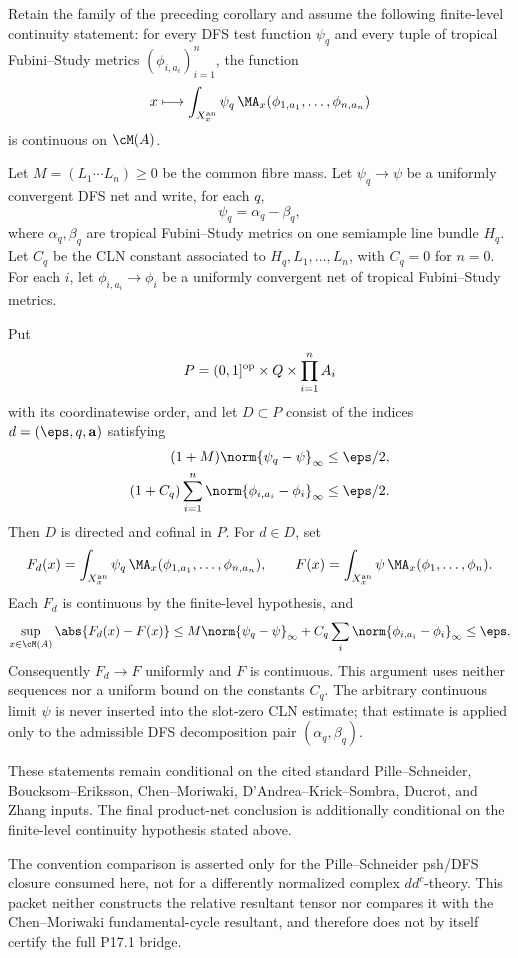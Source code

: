 \begin{corollary}
\label{cor:p171-production-product-net}
Retain the family of the preceding corollary and assume the following
finite-level continuity statement: for every DFS test function
\(\psi_q\) and every tuple of tropical Fubini--Study metrics
\((\phi_{i,a_i})_{i=1}^n\), the function
\[
 x\longmapsto
 \int_{X_x^{\rm an}}\psi_q\,
 \MA_x(\phi_{1,a_1},\ldots,\phi_{n,a_n})
\]
is continuous on \(\cM(A)\).

Let \(M=(L_1\cdots L_n)\geq0\) be the common fibre mass.  Let
\(\psi_q\to\psi\) be a uniformly convergent DFS net and write, for each
\(q\),
\[
 \psi_q=\alpha_q-\beta_q,
\]
where \(\alpha_q,\beta_q\) are tropical Fubini--Study metrics on one
semiample line bundle \(H_q\).  Let \(C_q\) be the CLN constant associated
to \(H_q,L_1,\ldots,L_n\), with \(C_q=0\) for \(n=0\).  For each \(i\),
let \(\phi_{i,a_i}\to\phi_i\) be a uniformly convergent net of tropical
Fubini--Study metrics.

Put
\[
 P=(0,1]^{\rm op}\times Q\times\prod_{i=1}^nA_i
\]
with its coordinatewise order, and let \(D\subset P\) consist of the
indices \(d=(\eps,q,\mathbf a)\) satisfying
\begin{align}
 (1+M)\norm{\psi_q-\psi}_\infty&\leq\eps/2,
 \label{eq:p171-production-product-test}\\
 (1+C_q)\sum_{i=1}^n
 \norm{\phi_{i,a_i}-\phi_i}_\infty&\leq\eps/2.
 \label{eq:p171-production-product-metrics}
\end{align}
Then \(D\) is directed and cofinal in \(P\).  For \(d\in D\), set
\[
 F_d(x)=
 \int_{X_x^{\rm an}}\psi_q\,
 \MA_x(\phi_{1,a_1},\ldots,\phi_{n,a_n}),
 \qquad
 F(x)=
 \int_{X_x^{\rm an}}\psi\,
 \MA_x(\phi_1,\ldots,\phi_n).
\]
Each \(F_d\) is continuous by the finite-level hypothesis, and
\begin{equation}
 \sup_{x\in\cM(A)}\abs{F_d(x)-F(x)}
 \leq
 M\norm{\psi_q-\psi}_\infty
 +
 C_q\sum_i\norm{\phi_{i,a_i}-\phi_i}_\infty
 \leq\eps.
 \label{eq:p171-production-product-bound}
\end{equation}
Consequently \(F_d\to F\) uniformly and \(F\) is continuous.  This
argument uses neither sequences nor a uniform bound on the constants
\(C_q\).  The arbitrary continuous limit \(\psi\) is never inserted into
the slot-zero CLN estimate; that estimate is applied only to the
admissible DFS decomposition pair \((\alpha_q,\beta_q)\).
\end{corollary}

\begin{remark}
These statements remain conditional on the cited standard
Pille--Schneider, Boucksom--Eriksson, Chen--Moriwaki,
D'Andrea--Krick--Sombra, Ducrot, and Zhang inputs.  The final
product-net conclusion is additionally conditional on the finite-level
continuity hypothesis stated above.

The convention comparison is asserted only for the
Pille--Schneider psh/DFS closure consumed here, not for a differently
normalized complex \(dd^c\)-theory.  This packet neither constructs the
relative resultant tensor nor compares it with the Chen--Moriwaki
fundamental-cycle resultant, and therefore does not by itself certify the
full P17.1 bridge.
\end{remark}
